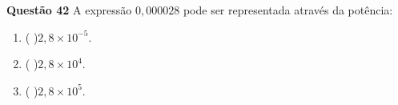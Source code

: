{\bf Questão 42} 
A expressão $0,000028$ pode ser representada através da potência:
\begin{multicols}{2}
\begin{enumerate}
		\item ( )$ 2,8 \times 10^{-5}$.
\item ( )$ 2,8 \times 10^4$.
\item ( )$ 2,8 \times 10^5$.
\end{enumerate}
\end{multicols}
